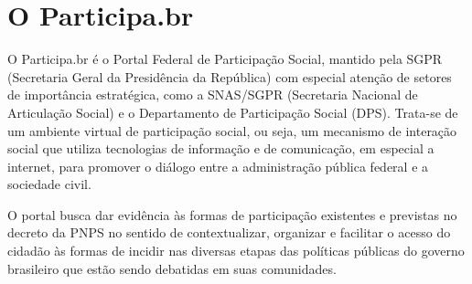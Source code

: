 \documentclass{article}
\begin{document}
\section{O Participa.br}

%


O Participa.br é o Portal Federal de Participação Social, mantido pela SGPR
(Secretaria Geral da Presidência da República) com especial atenção de setores
de importância estratégica, como a SNAS/SGPR (Secretaria Nacional de
Articulação Social) e o Departamento de Participação Social (DPS). Trata-se de
um ambiente virtual de participação social, ou seja, um mecanismo de interação
social que utiliza tecnologias de informação e de comunicação, em especial a
internet, para promover o diálogo entre a administração pública federal e a
sociedade civil.


O portal busca dar evidência às formas de participação existentes e previstas
no decreto da PNPS no sentido de contextualizar, organizar e facilitar o acesso
do cidadão às formas de incidir nas diversas etapas das políticas públicas do
governo brasileiro que estão sendo debatidas em suas comunidades.
\end{document}
